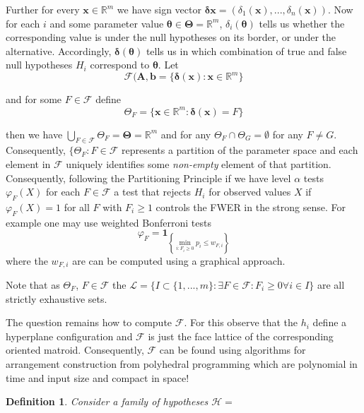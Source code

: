 \documentclass[a4paper,12pt]{article}
\newtheorem{definition}{Definition}
\newcommand{\bs}[1]{\boldsymbol{#1}}
\newcommand{\indf}[1]{\mathbf{1}_{\left\{#1\right\}}}
\newcommand{\R}{\mathbb{R}}
\begin{document}
Further for every $\bs{x} \in \mathbb{R}^m$ we have  sign vector
$\bs{\delta}{\bs{x}}= (\delta_1(\bs{x}),...,\delta_n(\bs{x}))$. Now
for each $i$ and some parameter value $\bs{\theta} \in \bs{\Theta} = \R^m$,
$\delta_i(\bs{\theta})$ tells us whether the corresponding value is under the null
hypotheses on its border, or under the alternative. Accordingly,
$\bs{\delta}(\bs{\theta})$ tells us in which combination of true and
false null hypotheses $H_i$ correspond to $\bs{\theta}$. Let
\begin{equation}
\label{eq:faces}
\mathcal{F}(\bs{A},\bs{b} = \{\bs{\delta}(\bs{x}): \bs{x} \in \R^m\}
\end{equation}

and for some $F \in \mathcal{F}$ define
\begin{equation}
  \label{eq:partition}
  \Theta_F = \{\bs{x} \in \R^m: \bs{\delta}(\bs{x}) = F\}
\end{equation}

then we have $\bigcup_{F \in \mathcal{F}} \Theta_F = \bs{\Theta} =
\R^m$ and for any $\Theta_F \cap \Theta_G = \emptyset$ for any $F \neq
G$. Consequently, $\{\Theta_F:F \in \mathcal{F}$ represents a
partition of the parameter space and each element in $\mathcal{F}$
uniquely identifies some {\em non-empty} element of that partition. Consequently,
following the Partitioning Principle \cite[]{finner2002partitioning}
if we have level $\alpha$ tests $\varphi_F(X)$ for each $F \in
\mathcal{F}$ a test that rejects $H_i$ for observed values $X$ if
$\varphi_F(X) = 1$ for all $F$ with $F_i \geq 1$ controls the FWER in
the strong sense. For example one may use  weighted Bonferroni tests
\begin{equation}
  \label{eq:bonferroni}
  \varphi_F = \indf{\min_{i:F_i \geq 0}p_i \leq w_{F,i}}
\end{equation}
where the $w_{F,i}$ are can be computed using a graphical approach.

Note that as $\Theta_F$, $F \in \mathcal{F}$ the $\mathscr{L} = \{I \subset \{1,...,m\}: \exists F \in
\mathcal{F}: F_i \geq 0 \forall i \in I\}$ are all strictly exhaustive sets.  

The question remains how to compute $\mathcal{F}$. For this observe
that the $h_i$ define a hyperplane configuration and $\mathcal{F}$ is
just the face lattice of the corresponding oriented
matroid. Consequently, $\mathcal{F}$ can be found using algorithms
for arrangement construction from polyhedral programming
\cite{Avis-KF-92,Avis-KF-96,Ferrez-KF-Liebling-01} which are
polynomial in time and input size and compact in space!


\begin{definition}
  Consider a family of hypotheses $\mathscr{H} =$
\end{definition}
\end{document}
